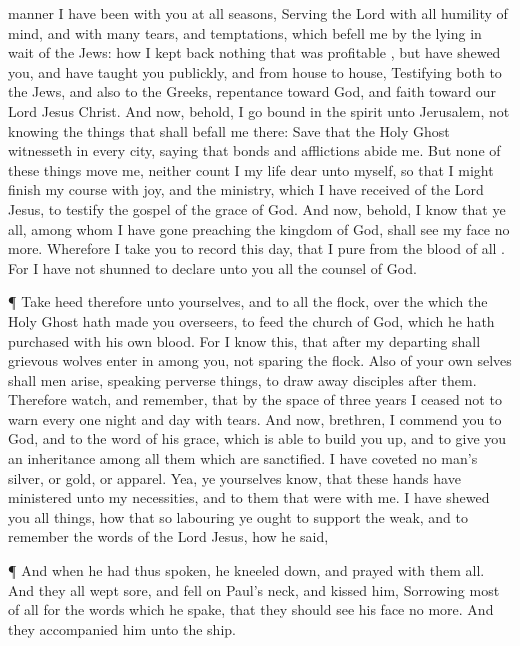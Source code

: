 {manner I have
been
with
you at
all
seasons,
Serving the
Lord
with
all humility of
mind,
and with
many
tears,
and
temptations, which
befell
me
by the lying in
wait of the
Jews:
how I kept
back
nothing that was
profitable
{},
but have
shewed
you,
and have
taught
you
publickly,
and
from house to
house,
Testifying
both to the
Jews, and
also to the
Greeks,
repentance
toward
God,
and
faith
toward
our
Lord
Jesus
Christ.
And
now,
behold,
I
go
bound in the
spirit
unto
Jerusalem,
not
knowing the
things
that shall
befall
me
there:
Save
that the
Holy
Ghost
witnesseth
in every
city,
saying
that
bonds
and
afflictions
abide
me.
But
none of these
things move
me,
neither count
I
my
life
dear unto
myself,
so that I might
finish
my
course
with
joy,
and the
ministry,
which I have
received
of the
Lord
Jesus, to
testify the
gospel of the
grace of
God.
And
now,
behold,
I
know
that
ye
all,
among
whom I have
gone
preaching the
kingdom of
God, shall
see
my
face no
more.
Wherefore I
take
you to
record
this
day,
that
I
{}
pure
from the
blood of
all
{}.
For I
have
not
shunned
to
declare unto
you
all the
counsel of
God.
\par }{\PP {}¶ Take
heed
therefore unto
yourselves,
and to
all the
flock,
over the
which the
Holy
Ghost hath
made
you
overseers, to
feed the
church of
God,
which he hath
purchased
with his
own
blood.
For
I
know
this,
that
after
my
departing shall
grievous
wolves
enter in
among
you,
not
sparing the
flock.
Also
of
your own
selves
shall
men
arise,
speaking perverse
things, to draw
away
disciples
after
them.
Therefore
watch, and
remember,
that by the space of three
years I
ceased
not to
warn
every
one
night
and
day
with
tears.
And
now,
brethren, I
commend
you to
God,
and to the
word of
his
grace, which is
able to build you
up,
and to
give
you an
inheritance
among
all them
which are
sanctified.
I have
coveted no
man’s
silver,
or
gold,
or
apparel.
Yea,
ye
yourselves
know,
that
these
hands have
ministered unto
my
necessities,
and to
them that
were
with
me.
I have
shewed
you all
things, how
that
so
labouring ye
ought to
support the
weak,
and to
remember the
words of the
Lord
Jesus,
how
he
said,
{}
\par }{\PP {}¶
And when he
had
thus
spoken, he kneeled
down, and
prayed
with
them
all.
And
they
all
wept
sore,
and
fell
on
Paul’s
neck, and
kissed
him,
Sorrowing most of
all
for the
words
which he
spake,
that they
should
see
his
face no
more.
And they
accompanied
him
unto the
ship.

}

